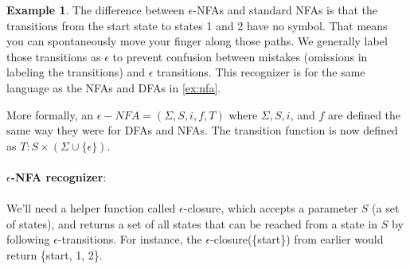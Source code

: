 \documentclass[]{article}
\theoremstyle{definition}
\newtheorem{ex}{Example}[section]
\begin{document}
\begin{ex}
					The difference between $\epsilon$-NFAs and standard NFAs is that the transitions from the start state to states 1 and 2 have no symbol. That means you can spontaneously move your finger along those paths. We generally label those transitions as $\epsilon$ to prevent confusion between mistakes (omissions in labeling the transitions) and $\epsilon$ transitions. This recognizer is for the same language as the NFAs and DFAs in \ref{ex:nfa}.
				\end{ex}

				More formally, an $\epsilon-NFA = (\Sigma, S, i, f, T)$ where $\Sigma, S, i$, and $f$ are defined the same way they were for DFAs and NFAs. The transition function is now defined as $T: S \times (\Sigma \cup \{ \epsilon \} )$.
				\\ \\
				\textbf{$\epsilon$-NFA recognizer}:
				\\ \\
				We'll need a helper function called $\epsilon$-closure, which accepts a parameter $S$ (a set of states), and returns a set of all states that can be reached from a state in $S$ by following $\epsilon$-transitions. For instance, the $\epsilon$-closure(\{start\}) from earlier would return \{start, 1, 2\}.
\end{document}
